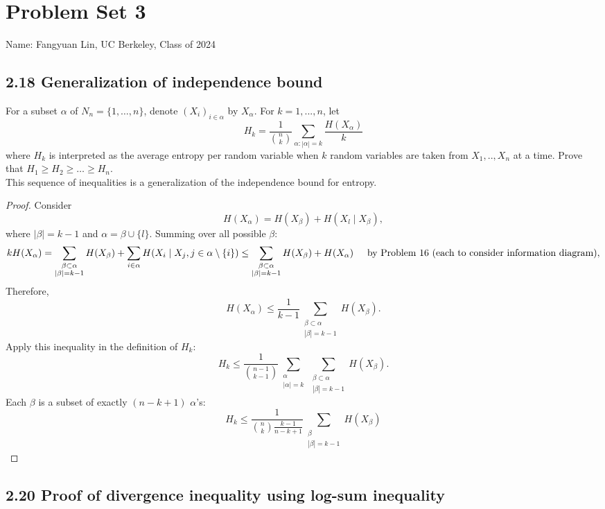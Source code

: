 \documentclass[../main.tex]{subfiles}
\begin{document}
\section*{Problem Set 3}
    Name: Fangyuan Lin, UC Berkeley, Class of 2024
\subsection*{2.18 Generalization of independence bound}
For a subset $\alpha$ of $N_n=\{1,\dots,n\}$, denote $(X_i)_{i\in\alpha}$ by $X_\alpha$. For $k=1,...,n$, let \begin{equation*}
    H_k=\frac{1}{\binom{n}{k}}\sum_{\alpha:|\alpha|=k}\frac{H(X_\alpha)}{k}
\end{equation*} where $H_k$ is interpreted as the average entropy per random variable when $k$ random variables are taken from $X_1,..,X_n$ at a time. Prove that $H_1\geq H_2\geq\dots\geq H_n$.\\
This sequence of inequalities is a generalization of the independence bound for entropy.
\begin{proof}
    Consider
\[
H(X_\alpha) = H(X_\beta) + H(X_l \mid X_\beta),
\]
where \(|\beta| = k - 1\) and \(\alpha = \beta \cup \{l\}\). Summing over all possible \(\beta\):
\[
kH(X_\alpha) = \sum_{\substack{\beta \subset \alpha \\ |\beta| = k-1}} H(X_\beta) + \sum_{i \in \alpha} H(X_i \mid X_j, j \in \alpha \setminus \{i\}) \leq \sum_{\substack{\beta \subset \alpha \\ |\beta| = k-1}} H(X_\beta) + H(X_\alpha) \hspace{5mm} \text{by Problem 16 (each to consider information diagram)},
\]
Therefore,
\[
H(X_\alpha) \leq \frac{1}{k - 1} \sum_{\substack{\beta \subset \alpha \\ |\beta| = k-1}} H(X_\beta).
\]
Apply this inequality in the definition of \(H_k\):
\[
H_k \leq \frac{1}{\binom{n-1}{k-1}} \sum_{\substack{\alpha \\ |\alpha|=k}} \sum_{\substack{\beta \subset \alpha \\ |\beta|=k-1}} H(X_\beta).
\]
Each \(\beta\) is a subset of exactly \((n-k+1)\) \(\alpha\)'s:
\[
H_k \leq \frac{1}{\binom{n}{k}\frac{k-1}{n-k+1} }  \sum_{\substack{\beta \\ |\beta|=k-1}} H(X_\beta) 
\]

\end{proof}
\subsection*{2.20 Proof of divergence inequality using log-sum inequality}
\end{document}
